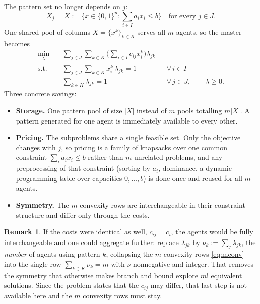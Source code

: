 \documentclass[11pt]{article}
\DeclareMathOperator*{\minimize}{min}
\theoremstyle{definition}
\newtheorem{remark}{Remark}
\theoremstyle{plain}
\begin{document}
The pattern set no longer depends on $j$:
\[
  \boxed{\;
  X_j = X := \Big\{ x \in \{0,1\}^n :
    \sum_{i \in I} a_i x_i \le b \Big\}
  \quad \text{for every } j \in J. \;}
\]
One shared pool of columns $X = \{x^k\}_{k \in K}$ serves all $m$
agents, so the master becomes
\begin{align}
  \minimize_{\lambda} \quad
    & \sum_{j \in J} \sum_{k \in K}
      \Big( \sum_{i \in I} c_{ij} x^k_i \Big) \lambda_{jk} \\
  \text{s.t.} \quad
    & \sum_{j \in J} \sum_{k \in K} x^k_i\, \lambda_{jk} = 1
      && \forall\, i \in I \\
    & \sum_{k \in K} \lambda_{jk} = 1 && \forall\, j \in J,
      \qquad \lambda \ge 0 .
\end{align}
Three concrete savings:
\begin{itemize}
  \item \textbf{Storage.} One pattern pool of size $|X|$ instead of $m$
        pools totalling $m|X|$. A pattern generated for one agent is
        immediately available to every other.
  \item \textbf{Pricing.} The subproblems share a single feasible set.
        Only the objective changes with $j$, so pricing is a family of
        knapsacks over one common constraint
        $\sum_i a_i x_i \le b$ rather than $m$ unrelated problems, and
        any preprocessing of that constraint (sorting by $a_i$,
        dominance, a dynamic-programming table over capacities
        $0,\dots,b$) is done once and reused for all $m$ agents.
  \item \textbf{Symmetry.} The $m$ convexity rows are interchangeable in
        their constraint structure and differ only through the costs.
\end{itemize}

\begin{remark}
If the costs were identical as well, $c_{ij} = c_i$, the agents would be
fully interchangeable and one could aggregate further: replace
$\lambda_{jk}$ by $\nu_k := \sum_j \lambda_{jk}$, the \emph{number} of
agents using pattern $k$, collapsing the $m$ convexity rows
\eqref{eq:mconv} into the single row $\sum_{k \in K} \nu_k = m$ with
$\nu$ nonnegative and integer. That removes the symmetry that otherwise
makes branch and bound explore $m!$ equivalent solutions. Since the
problem states that the $c_{ij}$ may differ, that last step is not
available here and the $m$ convexity rows must stay.
\end{remark}
\end{document}
